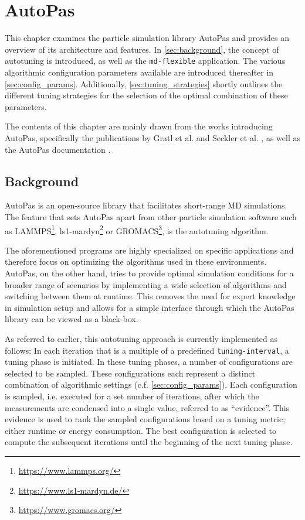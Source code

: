 \chapter[AutoPas]{AutoPas}
\label{cp:autopas}

{
	\parindent0pt
	This chapter examines the particle simulation library AutoPas and provides an overview of its architecture and features. In \autoref{sec:background}, the concept of autotuning is introduced, as well as the \texttt{md-flexible} application. %
	The various algorithmic configuration parameters available  are introduced thereafter in \autoref{sec:config_params}. Additionally, \autoref{sec:tuning_strategies} shortly outlines the different tuning strategies for the selection of the optimal combination of these parameters.

	The contents of this chapter are mainly drawn from the works introducing AutoPas, specifically the publications by Gratl et al. \cite{Gratl2019, Gratl2021, GratlGassner2025} and Seckler et al. \cite{Seckler2021}, as well as the AutoPas documentation \cite{AutoPas2025}.
}


\section{Background}
\label{sec:background}
AutoPas is an open-source \CC{} library that facilitates short-range MD simulations. The feature that sets AutoPas apart from other particle simulation software such as LAMMPS\footnote{\href{https://www.lammps.org/}{https://www.lammps.org/}}, ls1-mardyn\footnote{\href{https://www.ls1-mardyn.de/}{https://www.ls1-mardyn.de/}} or GROMACS\footnote{\href{https://www.gromacs.org/}{https://www.gromacs.org/}}, is the autotuning algorithm.

The aforementioned programs are highly specialized on specific applications and therefore focus on optimizing the algorithms used in these environments.
AutoPas, on the other hand, tries to provide optimal simulation conditions for a broader range of scenarios by implementing a wide selection of algorithms and switching between them at runtime.
This removes the need for expert knowledge in simulation setup and allows for a simple interface through which the AutoPas library can be viewed as a black-box.

As referred to earlier, this autotuning approach is currently implemented as follows: In each iteration that is a multiple of a predefined \texttt{tuning-interval}, a tuning phase is initiated. In these tuning phases, a number of configurations are selected to be sampled. These configurations each represent a distinct combination of algorithmic settings (c.f. \autoref{sec:config_params}). Each configuration is sampled, i.e. executed for a set number of iterations, after which the measurements are condensed into a single value, referred to as \enquote{evidence}. This evidence is used to rank the sampled configurations based on a tuning metric; either runtime or energy consumption. The best configuration is selected to compute the subsequent iterations until the beginning of the next tuning phase.

